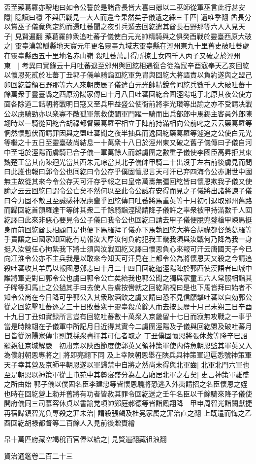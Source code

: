 盃至藥葛羅亦酹地曰如令公誓於是諸酋長皆大喜曰曏以二巫師從軍巫言此行甚安隱|{
	隐讀曰穩}
不與唐戰見一大人而還今果然矣子儀遺之綵三千匹|{
	遺唯季翻}
酋長分以賞巫子儀竟與定約而還吐蕃聞之夜引兵遁去回紇遣其酋長石野那等六人入見天子|{
	見賢遍翻}
藥葛羅帥衆追吐蕃子儀使白元光帥精騎與之俱癸酉戰於靈臺西原大破之|{
	靈臺漢鶉觚縣地天寶元年更名靈臺九域志靈臺縣在涇州東九十里舊史破吐蕃處在靈臺縣西五十里地名赤山嶺}
殺吐蕃萬計得所掠士女四千人丙子又破之於涇州東　|{
	考異曰實錄云十月吐蕃退至邠州與回紇相遇復合從為寇辛酉寇奉天乙亥回紇以懷恩死貳於吐蕃丁丑郭子儀单騎詣回紇軍免胄與回紇大將語責以負約遂與之盟己卯回紇首領石野那等六人來朝庚辰子儀遣白元光帥精銳會囘紇兵數千人大破吐蕃十餘萬衆于靈臺縣之西原汾陽家傳曰十月八日吐蕃回紇合圍涇陽屯于北原其夜公使方面各除道二詰朝將戰明日寇又至兵甲益盛公使衙前將李光瓚等出諭之亦不受請决戰公以虜騎勁亦以衆寡不敵孤軍無救使闢軍門躍一騎而出兵部郎中馬錫主客員外郎陳翃時以一騎從回紇合胡祿都督藥葛羅宰相立于陣前持滿相向公前叱之云云藥葛羅等惘然懷慙伏而請罪因與之盟吐蕃聞之夜半抽兵而逸回紇藥葛羅等遽追之公使白元光等繼之十五日至靈臺破尚結息一十萬衆十八日於涇州東又破之舊子儀傳曰子儀自河中至屯於涇陽而虜騎已合子儀一軍萬餘人而雜虜圍之數重子儀使李國臣高昇拒其東魏楚王當其南陳迴光當其西朱元琮當其北子儀帥甲騎二十出沒于左右前後虜見而問曰此誰也報曰郭令公也囘紇曰令公存乎僕固懷恩言天可汗已弃四海令公亦謝世中國無主故從其來今令公存天可汗存乎報之曰皇帝萬夀無彊回紇皆曰懷恩欺我子儀又使諭之云云回紇曰謂令公亡矣不然何以至此令公誠存安得而見之子儀將出諸將諫子儀曰今力固不敵且至誠感神况虜輩乎回紇傳曰吐蕃將馬重英等十月初引退取邠州舊路而歸回紇首領羅達干等帥其衆二千餘騎詣涇陽請降子儀許之率衆被甲持滿數千人回紇譯曰此來非惡心要見令公子儀曰我令公也回紇曰請去甲子儀便脫兜鍪槍甲竦馬挺身而前回紇酋長相顧曰是也便下馬羅拜子儀亦下馬執回紇大將合胡祿都督藥葛羅等手責讓之曰國家知回紇冇功報汝大厚汝何負約犯我王畿我須與汝戰何乃降為我一身挺入汝營任心拘縶我下將士須與汝戰回紇又譯曰懷恩負心來報可汗云唐國天子今已向冮淮令公亦不主兵我是以敢來今知天可汗見在上都令公為將懷恩天又殺之今請追殺吐蕃收其羊馬以報國恩邠志曰十月二十四日回紇逼涇陽陣於郭西使漢語者曰城中誰將軍吏對曰郭令公也虜曰郭令公亡矣紿我也郭公聞之獨與家童五六人常服相詣其子晞等扣馬止之公撾其手曰去使人告虜按轡就之回紇熟視曰是也下馬皆拜曰始者不知令公尚在今日降可乎郭公入其衆取酒飲之虜又請曰恐不見信願擊吐蕃以自効郭公從之回紇擊吐蕃逐之三十日敗蕃衆于靈臺殺萬餘人而去按長歷十月己未朔三日辛酉十九日丁丑如實録所言豈有回紇吐蕃數十萬衆入京畿留十七日而寂無攻戰之一事乎當是時陳翃在子儀軍中所記月日近得其實今二虜圍涇陽及子儀與回紇盟及破吐蕃月日皆從汾陽家傳事則兼採衆書擇其可信者取之}
丁丑僕固懷恩將張休藏等降辛巳詔罷親征京城解嚴　初肅宗以陜西節度使郭英乂領神策軍使内侍魚朝恩監其軍英乂入為僕射朝恩專將之|{
	將即亮翻下同}
及上幸陜朝恩舉在陜兵與神策軍迎扈悉號神策軍天子幸其營及京師平朝恩遂以軍歸禁中自將之然尚未得與北軍齒|{
	北軍北門六軍也}
至是朝恩以神策軍從上屯苑中其勢寖盛分為左右廂居北軍之右矣|{
	史言神策軍雄盛之所由始}
郭子儀以僕固名臣李建忠等皆懷恩驍將恐逃入外夷請招之名臣懷恩之姪也時在回紇營上勑并舊將有功者皆赦其罪令回紇送之壬午名臣以千餘騎來降子儀使開府儀同三司慕容休貞以書諭党項帥鄭庭郝德等皆詣鳳翔降　甲申周智光詣闕獻捷再宿歸鎮智光負專殺之罪未治|{
	謂殺張麟及杜冕家属之罪治直之翻}
上既遣而悔之乙酉回紇胡禄都督等二百餘人入見前後贈賚繒

帛十萬匹府藏空竭稅百官俸以給之|{
	見賢遍翻藏徂浪翻}


資治通鑑卷二百二十三
